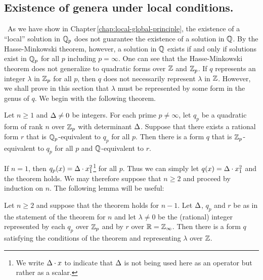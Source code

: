 \subsection{Existence of genera under local conditions.}~As we have show in Chapter\,\ref{chap:local-global-principle}, the existence of a ``local'' solution in \(\mathbb{Q}_p\) does not guarantee the existence of a solution in \(\mathbb{Q}\). By the Hasse-Minkowski theorem, however, a solution in \(\mathbb{Q}\) exists if and only if solutions exist in \(\mathbb{Q}_p\) for all \(p\) including \(p = \infty\). One can see that the Hasse-Minkowski theorem does not generalize to quadratic forms over \(\mathbb{Z}\) and \(\mathbb{Z}_p\). If \(q\) represents an integer \(\lambda\) in \(\mathbb{Z}_p\) for all \(p\), then \(q\) does not necessarily represent \(\lambda\) in \(\mathbb{Z}\). However, we shall prove in this section that \(\lambda\) must be represented by some form in the genus of \(q\). We begin with the following theorem.\label{sec:genus-existence}

\begin{theoremx}\label{thm:genus-existence}
    {\normalfont \cite[p.\,129, 141--143]{cassels2008rational}}
    Let \(n \geq 1\) and \({\Delta} \neq 0\) be integers. For each prime \(p \neq \infty\), let \(q_p\) be a quadratic form of rank \(n\) over \(\mathbb{Z}_p\) with determinant \({\Delta}\). Suppose that there exists a rational form \(r\) that is \(\mathbb{Q}_p\)-equivalent to \(q_p\) for all \(p\). Then there is a form \(q\) that is \(\mathbb{Z}_p\)-equivalent to \(q_p\) for all \(p\) and \(\mathbb{Q}\)-equivalent to \(r\).
\end{theoremx}

If \(n = 1\), then \(q_p(x) = {\Delta} \cdot x_1^2\)\footnote{We write \({\Delta} \cdot x\) to indicate that \({\Delta}\) is not being used here as an operator but rather as a scalar.} for all \(p\). Thus we can simply let \(q(x) = {\Delta} \cdot x_1^2\) and the theorem holds. We may therefore suppose that \(n \geq 2\) and proceed by induction on \(n\). The following lemma will be useful:

\begin{lemma}
    Let \(n \geq 2\) and suppose that the theorem holds for \(n - 1\). Let \({\Delta}\), \(q_p\) and \(r\) be as in the statement of the theorem for \(n\) and let \(\lambda \neq 0\) be the (rational) integer represented by each \(q_p\) over \(\mathbb{Z}_p\) and by \(r\) over \(\mathbb{R} = \mathbb{Z}_{\infty}\). Then there is a form \(q\) satisfying the conditions of the theorem and representing \(\lambda\) over \(\mathbb{Z}\).
\end{lemma}

